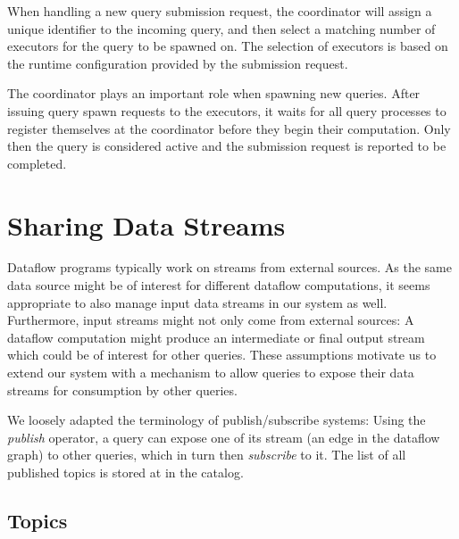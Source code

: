 When handling a new query submission request, the coordinator will assign a
unique identifier to the incoming query, and then select a
matching number of executors for the query to be spawned on. The selection
of executors is based on the runtime configuration provided by the submission
request.

The coordinator plays an important role when spawning new queries. After
issuing query spawn requests to the executors, it waits for all query processes
to register themselves at the coordinator before they begin their computation.
Only then the query is considered active and the submission request
is reported to be completed.


\section{Sharing Data Streams}

Dataflow programs typically work on streams from external sources. As the same
data source might be of interest for different dataflow computations, it seems
appropriate to also manage input data streams in our system as well. Furthermore,
input streams might not only come from external sources: A dataflow computation
might produce an intermediate or final output stream which could be of interest
for other queries. These assumptions motivate us to extend our system with a
mechanism to allow queries to expose their data streams for consumption by other
queries.


We loosely adapted the terminology of publish/subscribe systems: Using the
\emph{publish} operator, a query can expose one of its stream
(an edge in the dataflow graph) to other queries, which in turn then \emph{subscribe}
to it. The list of all published topics is stored at in the catalog.

\subsection{Topics}

